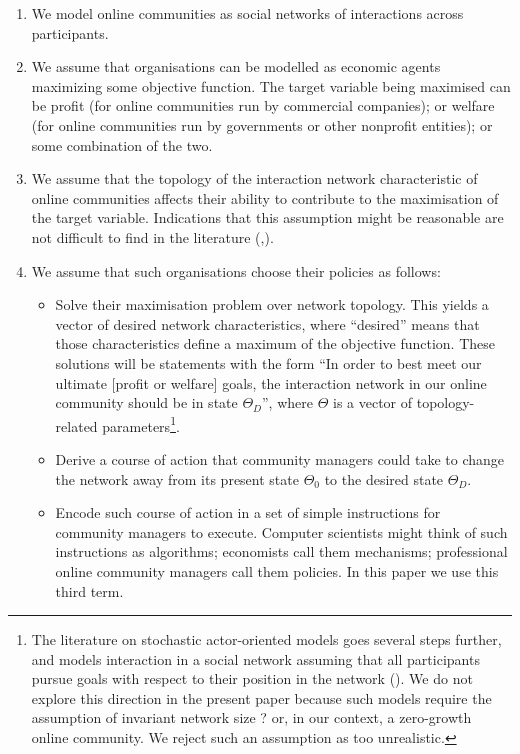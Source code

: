 \documentclass{article}
\begin{document}
\begin{enumerate}
\item We model online communities as social networks of interactions across participants. 
\item We assume that organisations can be modelled as economic agents maximizing some objective function. The target variable being maximised can be profit (for online communities run by commercial companies); or welfare (for online communities run by governments or other nonprofit entities); or some combination of the two. 
\item We assume that the topology of the interaction network characteristic of online communities affects their ability to contribute to the maximisation of the target variable. Indications that this assumption might be reasonable are not difficult to find in the literature (\cite{tapscott2008wikinomics},\cite{slegg2014facebook}).
\item We assume that such organisations choose their policies as follows: 
    \begin{itemize} 
	\item Solve their maximisation problem over network topology. This yields a vector of desired network characteristics, where ``desired'' means that those characteristics define a maximum of the objective function. These solutions will be statements with the form ``In order to best meet our ultimate [profit or welfare] goals, the interaction network in our online community should be in state $\Theta_D$'', where $\Theta$ is a vector of topology-related parameters\footnote{The literature on stochastic actor-oriented models goes several steps further, and models interaction in a social network assuming that all participants pursue goals with respect to their position in the network (\cite{snijders1996stochastic}). We do not explore this direction in the present paper because such models require the assumption of invariant network size ? or, in our context, a zero-growth online community. We reject such an assumption as too unrealistic.}.
	\item Derive a course of action that community managers could take to change the network away from its present state $\Theta_0$ to the desired state $\Theta_D$.
	\item Encode such course of action in a set of simple instructions for community managers to execute. Computer scientists might think of such instructions as algorithms; economists call them mechanisms; professional online community managers call them policies. In this paper we use this third term. 
    \end{itemize}
\end{enumerate}
\end{document}

